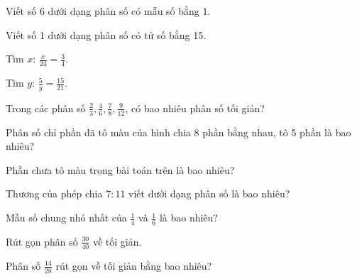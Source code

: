 \begin{ex}
Viết số 6 dưới dạng phân số có mẫu số bằng 1.
\end{ex}

\begin{ex}
Viết số 1 dưới dạng phân số có tử số bằng 15.
\end{ex}

\begin{ex}
Tìm $x$: $\frac{x}{24} = \frac{3}{4}$.
\end{ex}

\begin{ex}
Tìm $y$: $\frac{5}{y} = \frac{15}{21}$.
\end{ex}

\begin{ex}
Trong các phân số $\frac{2}{3}, \frac{4}{6}, \frac{7}{8}, \frac{9}{12}$, có bao nhiêu phân số tối giản?
\end{ex}

\begin{ex}
Phân số chỉ phần đã tô màu của hình chia 8 phần bằng nhau, tô 5 phần là bao nhiêu?
\end{ex}

\begin{ex}
Phần chưa tô màu trong bài toán trên là bao nhiêu?
\end{ex}

\begin{ex}
Thương của phép chia $7 : 11$ viết dưới dạng phân số là bao nhiêu?
\end{ex}

\begin{ex}
Mẫu số chung nhỏ nhất của $\frac{1}{4}$ và $\frac{1}{6}$ là bao nhiêu?
\end{ex}

\begin{ex}
Rút gọn phân số $\frac{30}{40}$ về tối giản.
\end{ex}

\begin{ex}
Phân số $\frac{14}{28}$ rút gọn về tối giản bằng bao nhiêu?
\end{ex}

